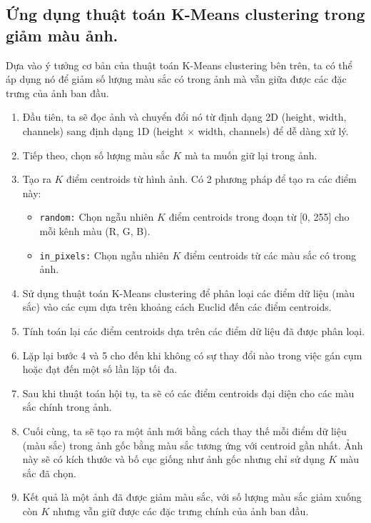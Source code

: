 \subsection{Ứng dụng thuật toán K-Means clustering trong giảm màu ảnh.}

Dựa vào ý tưởng cơ bản của thuật toán K-Means clustering bên trên, ta có thể áp dụng nó để giảm số lượng màu sắc có trong ảnh mà vẫn giữa được các đặc trưng của ảnh ban đầu.

\begin{enumerate}
	\item Đầu tiên, ta sẽ đọc ảnh và chuyển đổi nó từ định dạng 2D (height, width, channels) sang định dạng 1D (height $\times$ width, channels) để dễ dàng xử lý.
	\item Tiếp theo, chọn số lượng màu sắc $K$ mà ta muốn giữ lại trong ảnh.
	\item Tạo ra $K$ điểm centroids từ hình ảnh. Có 2 phương pháp để tạo ra các điểm này:
	      \begin{itemize}
		      \item \texttt{random:} Chọn ngẫu nhiên $K$ điểm centroids trong đoạn từ [0, 255] cho mỗi kênh màu (R, G, B).
		      \item \texttt{in\_pixels:} Chọn ngẫu nhiên $K$ điểm centroids từ các màu sắc có trong ảnh.
	      \end{itemize}
	\item Sử dụng thuật toán K-Means clustering để phân loại các điểm dữ liệu (màu sắc) vào các cụm dựa trên khoảng cách Euclid đến các điểm centroids.
	\item Tính toán lại các điểm centroids dựa trên các điểm dữ liệu đã được phân loại.
	\item Lặp lại bước 4 và 5 cho đến khi không có sự thay đổi nào trong việc gán cụm hoặc đạt đến một số lần lặp tối đa.
	\item Sau khi thuật toán hội tụ, ta sẽ có các điểm centroids đại diện cho các màu sắc chính trong ảnh.
	\item Cuối cùng, ta sẽ tạo ra một ảnh mới bằng cách thay thế mỗi điểm dữ liệu (màu sắc) trong ảnh gốc bằng màu sắc tương ứng với centroid gần nhất. Ảnh này sẽ có kích thước và bố cục giống như ảnh gốc nhưng chỉ sử dụng $K$ màu sắc đã chọn.
	\item Kết quả là một ảnh đã được giảm màu sắc, với số lượng màu sắc giảm xuống còn $K$ nhưng vẫn giữ được các đặc trưng chính của ảnh ban đầu. \cite{K-meansClustering2}
\end{enumerate}